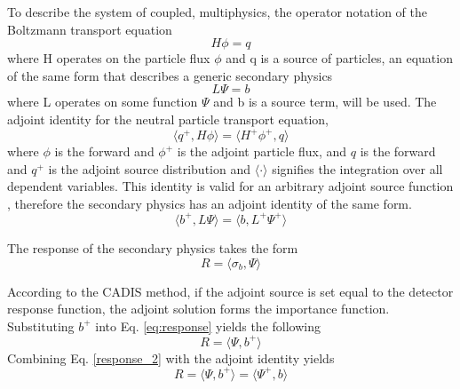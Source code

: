 To describe the system of coupled, multiphysics,
the operator notation of the Boltzmann transport equation
\begin{equation}
	H\phi = q
\end{equation}
where H operates on the particle flux $\phi$ and q is a source of particles, 
an equation of the same form that describes a generic secondary physics 
\begin{equation}
	L\Psi = b
\end{equation}
where L operates on some function $\Psi$ and b is a source term, will be used.
The adjoint identity for the neutral particle transport
equation, 
 \begin{equation}\label{eq:adj_identity}
		\langle q^{+}, H\phi \rangle =
		\langle H^{+}\phi^{+}, q \rangle
 \end{equation}
where $\phi$ is the forward and 
$\phi^{+}$ is the adjoint particle flux, and
$q$ is the forward and 
$q^{+}$ is the adjoint source distribution and $\langle \cdot \rangle$ signifies the
integration over all dependent variables.
This identity is valid for an arbitrary adjoint source function
\cite{l_m}, therefore the secondary physics has an adjoint identity of the same
form.
\begin{equation}\label{eq:adj_2_identity}
	\langle b^{+}, L\Psi \rangle =
	\langle b, L^{+}\Psi^{+} \rangle 
\end{equation}

The response of the secondary physics takes the form
\begin{equation}\label{eq:response}
	R = \langle \sigma_b , \Psi \rangle
\end{equation}

According to the CADIS method, 
if the adjoint source is set equal to the detector response
function, the adjoint solution forms the importance function.
Substituting $b^{+}$ into Eq. \ref{eq:response} yields the following
 \begin{equation}\label{eq:response_2}
	 R = \langle \Psi, b^{+} \rangle 
 \end{equation}
Combining Eq. \ref{response_2} with the adjoint identity yields
 \begin{equation}\label{eq:adj_2}
	 R = \langle \Psi, b^{+} \rangle 
		=\langle \Psi^{+} , b \rangle
 \end{equation}

